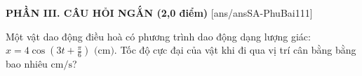 
\noindent \textbf{PHẦN III. CÂU HỎI NGẮN (2,0 điểm)}
[ans/ansSA-PhuBai111]

\begin{ex}%
	Một vật dao động điều hoà có phương trình dao động dạng lượng giác: $x = 4 \cos\left(3t + \frac{\pi}{6}\right)\text{ (cm)}$. Tốc độ cực đại của vật khi đi qua vị trí cân bằng bằng bao nhiêu $\text{cm/s}$?
\end{ex}

